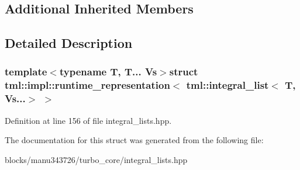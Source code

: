 \subsection*{Additional Inherited Members}


\subsection{Detailed Description}
\subsubsection*{template$<$typename T, T... Vs$>$struct tml\+::impl\+::runtime\+\_\+representation$<$ tml\+::integral\+\_\+list$<$ T, Vs...$>$ $>$}



Definition at line 156 of file integral\+\_\+lists.\+hpp.



The documentation for this struct was generated from the following file\+:\begin{DoxyCompactItemize}
\item 
blocks/manu343726/turbo\+\_\+core/integral\+\_\+lists.\+hpp\end{DoxyCompactItemize}
